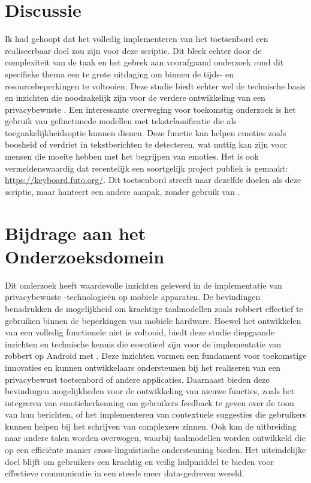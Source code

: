 \section{Discussie}

Ik had gehoopt dat het volledig implementeren van het toetsenbord een realiseerbaar doel zou zijn voor deze scriptie. Dit bleek echter door de complexiteit van de taak en het gebrek aan voorafgaand onderzoek rond dit specifieke thema een te grote uitdaging om binnen de tijds- en resourcebeperkingen te voltooien. Deze studie biedt echter wel de technische basis en inzichten die noodzakelijk zijn voor de verdere ontwikkeling van een privacybewuste .
Een interessante overweging voor toekomstig onderzoek is het gebruik van gefinetunede modellen met tekstclassificatie die als toegankelijkheidsoptie kunnen dienen. Deze functie kan helpen emoties zoals boosheid of verdriet in tekstberichten te detecteren, wat nuttig kan zijn voor mensen die moeite hebben met het begrijpen van emoties.
Het is ook vermeldenswaardig dat recentelijk een soortgelijk project publiek is gemaakt: \url{https://keyboard.futo.org/}. Dit toetsenbord streeft naar dezelfde doelen als deze scriptie, maar hanteert een andere aanpak, zonder gebruik van .

\section{Bijdrage aan het Onderzoeksdomein}

Dit onderzoek heeft waardevolle inzichten geleverd in de implementatie van privacybewuste -technologieën op mobiele apparaten. De bevindingen benadrukken de mogelijkheid om krachtige taalmodellen zoals \gls{robbert} effectief te gebruiken binnen de beperkingen van mobiele hardware. Hoewel het ontwikkelen van een volledig functionele  niet is voltooid, biedt deze studie diepgaande inzichten en technische kennis die essentieel zijn voor de implementatie van \gls{robbert} op Android met . Deze inzichten vormen een fundament voor toekomstige innovaties en kunnen ontwikkelaars ondersteunen bij het realiseren van een privacybewust toetsenbord of andere  applicaties.
Daarnaast bieden deze bevindingen mogelijkheden voor de ontwikkeling van nieuwe functies, zoals het integreren van emotieherkenning om gebruikers feedback te geven over de toon van hun berichten, of het implementeren van contextuele suggesties die gebruikers kunnen helpen bij het schrijven van complexere zinnen. Ook kan de uitbreiding naar andere talen worden overwogen, waarbij taalmodellen worden ontwikkeld die op een efficiënte manier cross-linguïstische  ondersteuning bieden. Het uiteindelijke doel blijft om gebruikers een krachtig en veilig hulpmiddel te bieden voor effectieve communicatie in een steeds meer data-gedreven wereld.